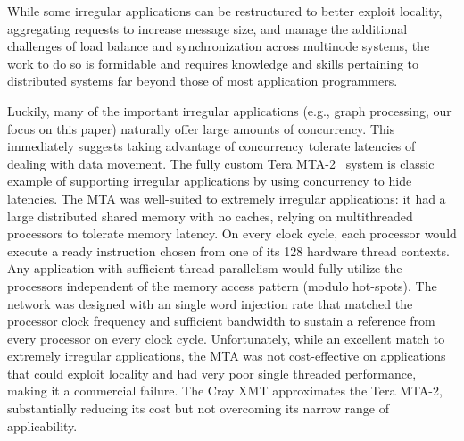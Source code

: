 While some irregular applications can be restructured to better exploit
locality, aggregating requests to increase message size, and manage the
additional challenges of load balance and synchronization across multinode
systems, the work to do so is formidable and requires knowledge and skills
pertaining to distributed systems far beyond those of most application
programmers.

Luckily, many of the important irregular applications (e.g., graph processing,
our focus on this paper) naturally offer large amounts of concurrency. This
immediately suggests taking advantage of concurrency tolerate latencies of
dealing with data movement. The fully custom Tera MTA-2~\cite{mta-2} system is
classic example of supporting irregular applications by using concurrency to
hide latencies. The MTA was well-suited to extremely irregular applications:
it had a large distributed shared memory with no caches, relying on
multithreaded processors to tolerate memory latency. On every clock cycle,
each processor would execute a ready instruction chosen from one of its 128
hardware thread contexts. Any application with sufficient thread parallelism
would fully utilize the processors independent of the memory access pattern
(modulo hot-spots). The network was designed with an single word injection
rate that matched the processor clock frequency and sufficient bandwidth to
sustain a reference from every processor on every clock cycle. Unfortunately,
while an excellent match to extremely irregular applications, the MTA was not
cost-effective on applications that could exploit locality and had very poor
single threaded performance, making it a commercial failure. The Cray XMT
approximates the Tera MTA-2, substantially reducing its cost but not
overcoming its narrow range of applicability.


% 
% 
% 

